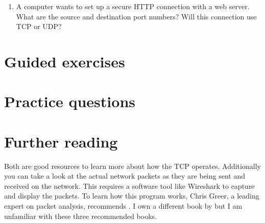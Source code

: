 \begin{enumerate}
\item
   A computer wants to set up a secure \acs{HTTP} connection with a web server.
   What are the source and destination port numbers?
   Will this connection use \acs{TCP} or \acs{UDP}?
\end{enumerate}


\section{Guided exercises}
\label{sec:transport-guided-ex}



\section{Practice questions}
\label{sec:transport-practice-qu}




\section{Further reading}
Both \textcite{stevens,comer} are good resources to learn more about how the \acf{TCP} operates.
Additionally you can take a look at the actual network packets as they are being sent and received on the network.
This requires a software tool like Wireshark to capture and display the packets.%
To learn how this program works, Chris Greer, a leading expert on packet analysis, recommends \textcite{chappell17,sanders,bock}.
I own a different book by \citeauthor{chappell17} but I am unfamiliar with these three recommended books.
